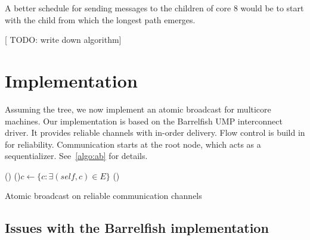 \documentclass{article}
\newcommand{\stefan}[1]{
  {\color{skRed}[{\color{red}{SK}} #1]}}
\begin{document}
A better schedule for sending messages to the children of core 8 would
be to start with the child from which the longest path emerges.

\stefan{TODO: write down algorithm}

\section{Implementation}

Assuming the tree, we now implement an atomic broadcast for multicore
machines. Our implementation is based on the Barrelfish UMP
interconnect driver. It provides reliable channels with in-order
delivery. Flow control is build in for reliability. Communication
starts at the root node, which acts as a
sequentializer. See~\ref{algo:ab} for details.

\begin{algorithm}[htb]
%
%
%
%
%
%
%
  \BlankLine
  \Fn(){}{
    \For(){$c \leftarrow \{ c: \exists (self, c) \in E \} $}{
    }
    \waitchild{}\;
    \;
  }
  \BlankLine
  \Fn(){}{
  }
  \caption{Atomic broadcast on reliable communication channels}
  \label{algo:ab}

\end{algorithm}

\subsection{Issues with the Barrelfish implementation}
\end{document}

